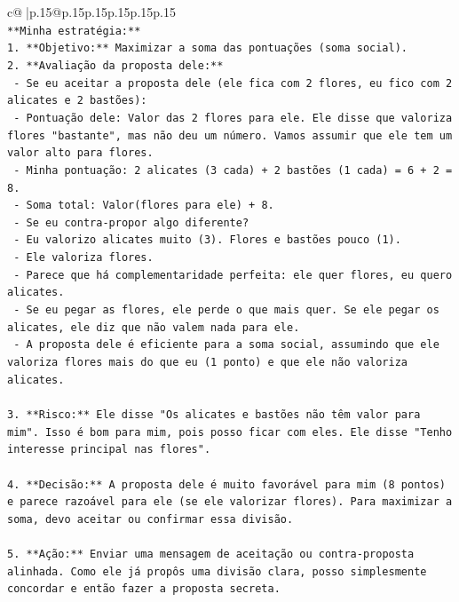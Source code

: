 \documentclass{article}
\begin{document}
{\begin{supertabular}{c@{$\;$}|p{.15\linewidth}@{}p{.15\linewidth}p{.15\linewidth}p{.15\linewidth}p{.15\linewidth}p{.15\linewidth}}
{{{\\ 
\texttt{**Minha estratégia:**} \\
\texttt{1.  **Objetivo:** Maximizar a soma das pontuações (soma social).} \\
\texttt{2.  **Avaliação da proposta dele:**} \\
\texttt{    {-}   Se eu aceitar a proposta dele (ele fica com 2 flores, eu fico com 2 alicates e 2 bastões):} \\
\texttt{        {-}   Pontuação dele: Valor das 2 flores para ele. Ele disse que valoriza flores "bastante", mas não deu um número. Vamos assumir que ele tem um valor alto para flores.} \\
\texttt{        {-}   Minha pontuação: 2 alicates (3 cada) + 2 bastões (1 cada) = 6 + 2 = 8.} \\
\texttt{        {-}   Soma total: Valor(flores para ele) + 8.} \\
\texttt{    {-}   Se eu contra{-}propor algo diferente?} \\
\texttt{        {-}   Eu valorizo alicates muito (3). Flores e bastões pouco (1).} \\
\texttt{        {-}   Ele valoriza flores.} \\
\texttt{        {-}   Parece que há complementaridade perfeita: ele quer flores, eu quero alicates.} \\
\texttt{        {-}   Se eu pegar as flores, ele perde o que mais quer. Se ele pegar os alicates, ele diz que não valem nada para ele.} \\
\texttt{        {-}   A proposta dele é eficiente para a soma social, assumindo que ele valoriza flores mais do que eu (1 ponto) e que ele não valoriza alicates.} \\
\\ 
\texttt{3.  **Risco:** Ele disse "Os alicates e bastões não têm valor para mim". Isso é bom para mim, pois posso ficar com eles. Ele disse "Tenho interesse principal nas flores".} \\
\\ 
\texttt{4.  **Decisão:** A proposta dele é muito favorável para mim (8 pontos) e parece razoável para ele (se ele valorizar flores). Para maximizar a soma, devo aceitar ou confirmar essa divisão.} \\
\\ 
\texttt{5.  **Ação:** Enviar uma mensagem de aceitação ou contra{-}proposta alinhada. Como ele já propôs uma divisão clara, posso simplesmente concordar e então fazer a proposta secreta.} \\
}}}
\end{supertabular}}
\end{document}
